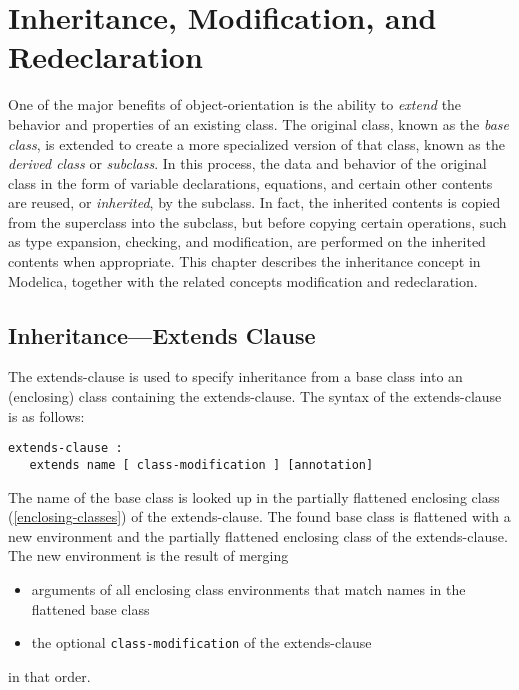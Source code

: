 \chapter{Inheritance, Modification, and Redeclaration}

One of the major benefits of object-orientation is the ability to
\emph{extend} the behavior and properties of an existing class. The
original class, known as the \emph{base class}, is extended to create a
more specialized version of that class, known as the \emph{derived
class} or \emph{subclass}. In this process, the data and behavior of the
original class in the form of variable declarations, equations, and
certain other contents are reused, or \emph{inherited}, by the subclass.
In fact, the inherited contents is copied from the superclass into the
subclass, but before copying certain operations, such as type expansion,
checking, and modification, are performed on the inherited contents when
appropriate. This chapter describes the inheritance concept in Modelica,
together with the related concepts modification and redeclaration.

\section{Inheritance---Extends Clause}

The extends-clause is used to specify inheritance from a base class into
an (enclosing) class containing the extends-clause. The syntax of the
extends-clause is as follows:
\begin{lstlisting}[language=grammar]
extends-clause :
   extends name [ class-modification ] [annotation]
\end{lstlisting}
The name of the base class is looked up in the partially flattened
enclosing class (\autoref{enclosing-classes}) of the extends-clause. The found base
class is flattened with a new environment and the partially flattened
enclosing class of the extends-clause. The new environment is the result
of merging

\begin{itemize}
\item
  arguments of all enclosing class environments that match names in the
  flattened base class
\item
  the optional \lstinline!class-modification! of the extends-clause
\end{itemize}
in that order.

